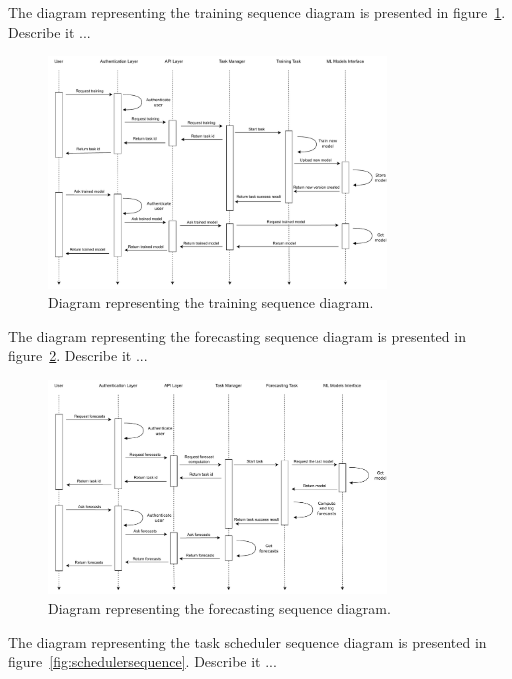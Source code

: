 The diagram representing the training sequence diagram is presented in figure~\ref{fig:trainingsequence}.
Describe it ...

\begin{figure}[H]
\centering 
\includegraphics[width=0.8\textwidth]{images/architecture_training_sequence}
\caption{Diagram representing the training sequence diagram.}
\label{fig:trainingsequence}
\end{figure}

The diagram representing the forecasting sequence diagram is presented in figure~\ref{fig:forecastingsequence}.
Describe it ...

\begin{figure}[H]
\centering 
\includegraphics[width=0.8\textwidth]{images/architecture_forecasting_sequence}
\caption{Diagram representing the forecasting sequence diagram.}
\label{fig:forecastingsequence}
\end{figure}

The diagram representing the task scheduler sequence diagram is presented in figure~\ref{fig:schedulersequence}.
Describe it ...

